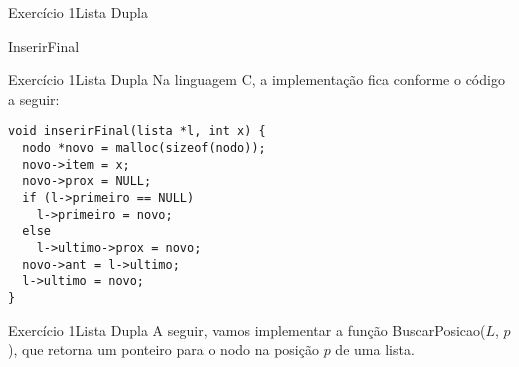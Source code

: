 \documentclass[aspectratio=169]{beamer}
\begin{document}

\begin{frame}[fragile]{Exercício 1}{Lista Dupla}
\begin{algorithm}[H]
\caption{InserirFinal} 
\label{ListaDuplaInserirFinal}
\end{algorithm}
\end{frame}


\begin{frame}[fragile]{Exercício 1}{Lista Dupla}
Na linguagem C, a implementação fica conforme o código a seguir:
\begin{lstlisting}[style=CStyle]
void inserirFinal(lista *l, int x) {
  nodo *novo = malloc(sizeof(nodo));
  novo->item = x;
  novo->prox = NULL;
  if (l->primeiro == NULL)
    l->primeiro = novo;
  else 
    l->ultimo->prox = novo;
  novo->ant = l->ultimo;
  l->ultimo = novo;  
}
\end{lstlisting}  
\end{frame}


\begin{frame}[fragile]{Exercício 1}{Lista Dupla}
A seguir, vamos implementar a função BuscarPosicao($L$, $p$), que retorna um ponteiro para o nodo na posição $p$ de uma lista.
\end{frame}

\end{document}
